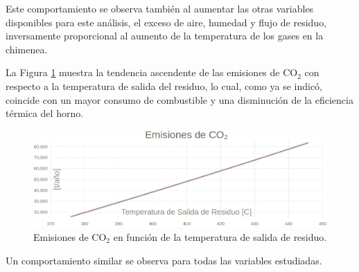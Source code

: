 \par Este comportamiento se observa también al aumentar las otras variables disponibles para este análisis, el exceso de aire, humedad y flujo de residuo, inversamente proporcional al aumento de la temperatura de los gases en la chimenea.
\par La Figura \ref{fig:graph-t_out-emi} muestra la tendencia ascendente de las emisiones de CO$_2$ con respecto a la temperatura de salida del residuo, lo cual, como ya se indicó, coincide con un mayor consumo de combustible y una disminución de la eficiencia térmica del horno.
\begin{figure}[H] \begin{center}
\includegraphics[scale=0.46]{images/graph-t_out-emi}
\caption[Emisiones de CO$_2$ en función de Temperatura de salida de residuo]{Emisiones de CO$_2$ en función de la temperatura de salida de residuo.}
\label{fig:graph-t_out-emi} \end{center} \end{figure}
\par Un comportamiento similar se observa para todas las variables estudiadas.

